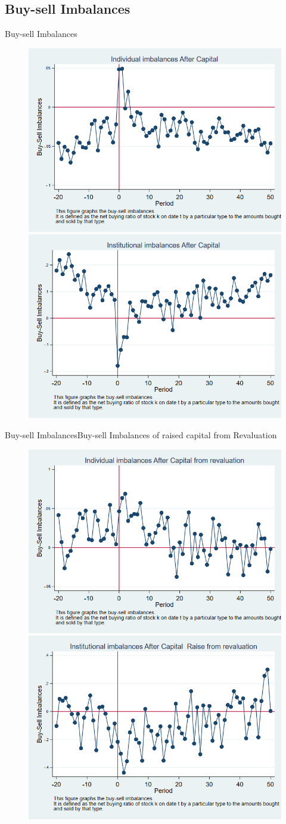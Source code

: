 \documentclass{beamer}
\begin{document}
	
	
	\subsection{Buy-sell Imbalances}
	
	\begin{frame}{Buy-sell Imbalances}
		\begin{figure}
			\centering
			\includegraphics[width=0.45\linewidth]{Output/IndImb.png}
			\includegraphics[width=0.45\linewidth]{Output/InsImb.png}
			\label{fig:indimb}
		\end{figure}
	\end{frame}
	\begin{frame}{Buy-sell Imbalances}{Buy-sell Imbalances of raised capital from Revaluation}
		\begin{figure}
			\centering
			\includegraphics[width=0.45\linewidth]{Output/IndImb_Revaluation.png}
			\includegraphics[width=0.45\linewidth]{Output/InsImb_Revaluation.png}
			\label{fig:indimbrevaluation}
		\end{figure}
	\end{frame}
\end{document}
